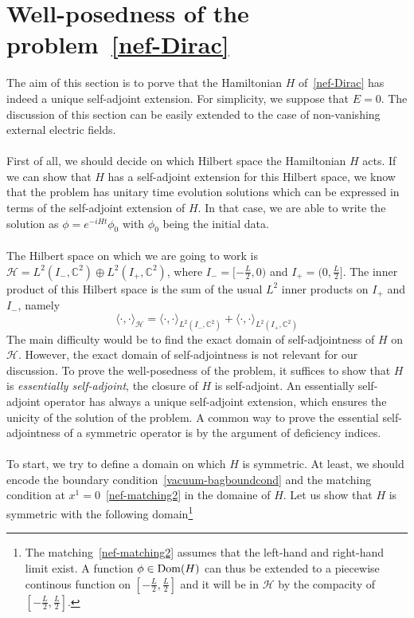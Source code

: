 \section{Well-posedness of the problem~\cref{nef-Dirac}}\label{vacuum-subsect-sa}
The aim of this section is to porve that the Hamiltonian $H$ of~\cref{nef-Dirac} has indeed a unique self-adjoint extension.
For simplicity, 
we suppose that $E = 0$.
The discussion of this section can be easily extended to the case of non-vanishing external electric fields.\\\\
First of all, we should decide on which Hilbert space the Hamiltonian $H$ acts.
If we can show that $H$ has a self-adjoint extension for this Hilbert space, 
we know that the problem has unitary time evolution solutions which can be expressed in terms of the self-adjoint extension of $H$.
In that case, we are able to write the solution as $\phi =  e^{-iHt}\phi_0$ with $\phi_0$ being the initial data.
\\\\
%
The Hilbert space on which we are going to work is $\mathcal{H} = L^{2}(I_-, \mathbb{C}^2) \oplus L^{2}(I_+, \mathbb{C}^2)$,  where $I_- = [-\frac{L}{2}, 0)$ and $I_+ = (0, \frac{L}{2}]$.
The inner product of this Hilbert space is the sum of the usual $L^2$ inner products on $I_+$ and $I_-$, namely
\begin{equation*}
\langle \cdot, \cdot\rangle_{\mathcal{H} } = \langle \cdot, \cdot\rangle_{L^{2}(I_-, \mathbb{C}^2)} +\langle \cdot, \cdot\rangle_{L^{2}(I_+, \mathbb{C}^2)}
\end{equation*}
The main difficulty would be to find the exact domain of self-adjointness of $H$ on $\mathcal{H}$.
However, the exact domain of self-adjointness is not relevant for our discussion.
To prove the well-posedness of the problem, it suffices to show that $H$ is \textit{essentially self-adjoint},
\ie the closure of $H$ is self-adjoint.
An essentially self-adjoint operator has always a unique self-adjoint extension, which ensures the unicity of the solution of the problem.
A common way to prove the essential self-adjointness of a symmetric operator is by the argument of deficiency indices.\\\\
%
To start, we try to define a domain on which $H$ is symmetric.
At least, we should encode the boundary condition~\cref{vacuum-bagboundcond} and the matching condition at $x^1 = 0$~\cref{nef-matching2} in the domaine of $H$.
Let us show that $H$ is symmetric with the following domain\footnote{
The matching~\cref{nef-matching2} assumes that the left-hand and right-hand limit exist. 
A function $\phi\in\mathrm{Dom}(H)$ can thus be extended to a piecewise continous function on $[-\frac L 2, \frac L 2]$ and it will be in $\mathcal{H}$ by the compacity of $[-\frac L 2, \frac L 2]$.
} 
